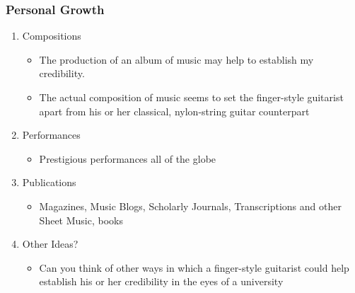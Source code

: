 \documentclass[11pt]{article}
\begin{document}
\subsubsection{Personal Growth}
\label{sec-1-2-3}
\begin{enumerate}
\item Compositions
\label{sec-1-2-3-1}
\begin{itemize}
\item The production of an album of music may help to establish my credibility.
\item The actual composition of music seems to set the finger-style guitarist
apart from his or her classical, nylon-string guitar counterpart
\end{itemize}
\item Performances
\label{sec-1-2-3-2}
\begin{itemize}
\item Prestigious performances all of the globe
\end{itemize}
\item Publications
\label{sec-1-2-3-3}
\begin{itemize}
\item Magazines, Music Blogs, Scholarly Journals, Transcriptions and other Sheet
Music, books
\end{itemize}
\item Other Ideas?
\label{sec-1-2-3-4}
\begin{itemize}
\item Can you think of other ways in which a finger-style guitarist could help
establish his or her credibility in the eyes of a university
\end{itemize}
\end{enumerate}
\end{document}
